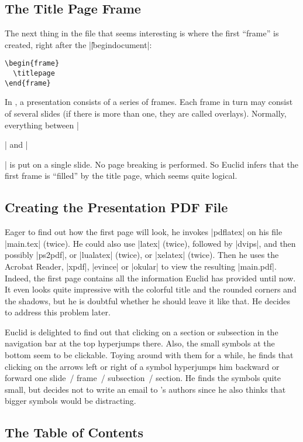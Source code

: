 \subsection{The Title Page Frame}

The next thing in the file that seems interesting is where the first ``frame'' is created, right after the |\||begin{document}|:
\begin{verbatim}
\begin{frame}
  \titlepage
\end{frame}
\end{verbatim}
In \beamer, a presentation consists of a series of frames. Each frame in turn may consist of several slides (if there is more than one, they are called overlays). Normally, everything between |\begin{frame}| and |\end{frame}| is put on a single slide. No page breaking is performed. So Euclid infers that the first frame is ``filled'' by the title page, which seems quite logical.


\subsection{Creating the Presentation PDF File}

Eager to find out how the first page will look, he invokes |pdflatex| on his file |main.tex| (twice). He could also use |latex| (twice), followed by |dvips|, and then possibly |ps2pdf|, or |lualatex| (twice), or |xelatex| (twice). Then he uses the Acrobat Reader, |xpdf|, |evince| or |okular| to view the resulting |main.pdf|. Indeed, the first page contains all the information Euclid has provided until now. It even looks quite impressive with the colorful title and the rounded corners and the shadows, but he is doubtful whether he should leave it like that. He decides to address this problem later.

Euclid is delighted to find out that clicking on a section or subsection in the navigation bar at the top hyperjumps there. Also, the small symbols at the bottom seem to be clickable. Toying around with them for a while, he finds that clicking on the arrows left or right of a symbol hyperjumps him backward or forward one slide~/ frame~/ subsection~/ section. He finds the symbols quite small, but decides not to write an email to \beamer's authors since he also thinks that bigger symbols would be distracting.


\subsection{The Table of Contents}


